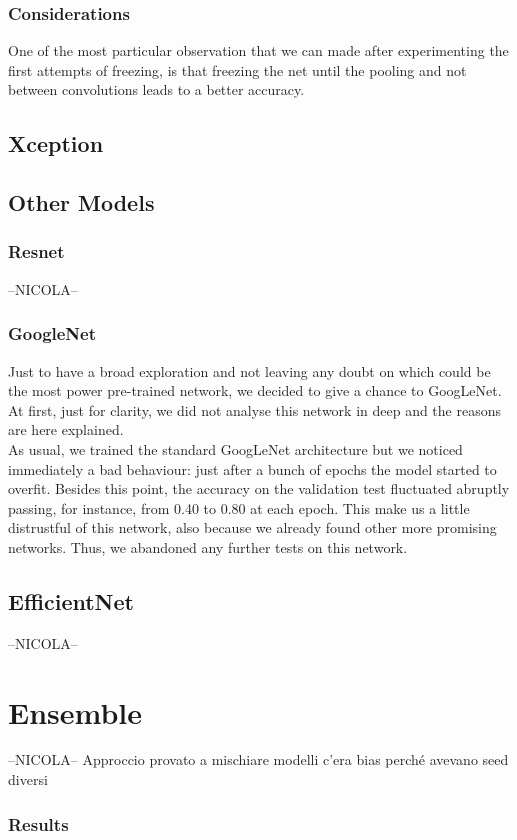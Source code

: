\documentclass[10pt]{article}
\begin{document}
\subsubsection{Considerations}
One of the most particular observation that we can made after experimenting the first attempts of freezing, is that freezing the net
until the pooling and not between convolutions leads to a better accuracy.

\subsection{Xception}

\subsection{Other Models}
\subsubsection{Resnet}
--NICOLA--
\subsubsection{GoogleNet}
Just to have a broad exploration and not leaving any doubt on which could be the most power pre-trained network, we decided to give a chance to GoogLeNet. At first, just for clarity, we did not analyse this network in deep and the reasons are here explained.\\[0.1cm]
As usual, we trained the standard GoogLeNet architecture but we noticed immediately a bad behaviour: just after a bunch of epochs the model started to overfit. Besides this point, the accuracy on the validation test fluctuated abruptly passing, for instance, from 0.40 to 0.80 at each epoch. This make us a little distrustful of this network, also because we already found other more promising networks. Thus, we abandoned any further tests on this network.
\subsection{EfficientNet}
--NICOLA--



\section{Ensemble}
--NICOLA--
Approccio
provato a mischiare modelli
          c'era bias perché avevano seed diversi
\subsubsection{Results}
\end{document}
